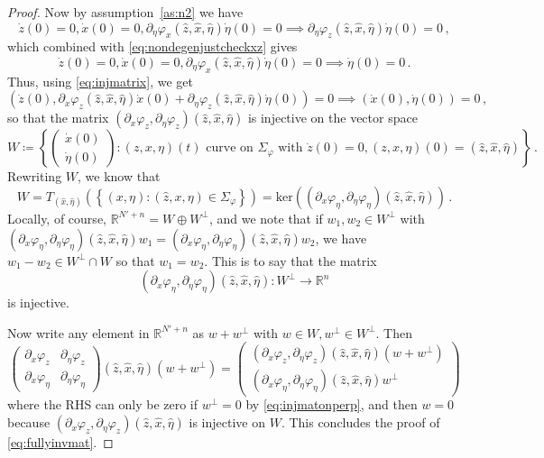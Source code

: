 \documentclass[10pt,a4paper]{amsart}
\newcommand{\RR}{\mathbb{R}}
\newcommand{\del}{\partial}
\begin{document}
\begin{proof}
	Now by assumption~\ref{as:n2} we have
	\[
		\dot z(0)=0, \dot x(0)=0,\del_\eta \varphi_x(\hat z, \hat x, \hat \eta) \dot \eta(0) =0 \implies \del_\eta\varphi_z(\hat z,\hat x,\hat \eta)\dot \eta(0) = 0\,,%
	\]
	which combined with \cref{eq:nondegenjustcheckxz} gives
	\[
		\dot z(0)=0, \dot x(0)=0,\del_\eta \varphi_x(\hat z, \hat x, \hat \eta) \dot \eta(0) =0 \implies \dot\eta(0)=0\,.
	\]
	Thus, using \cref{eq:injmatrix}, we get
	\[
		(\dot z(0), %
		\del_x\varphi_{z}(\hat z, \hat x, \hat \eta)\dot x(0) +  \del_\eta\varphi_{z}(\hat z, \hat x, \hat \eta)\dot\eta(0)) = 0 \implies (\dot x(0), \dot\eta(0)) =0\,,
	\]
	so that the matrix $(\del_x\varphi_z, \del_\eta\varphi_z)(\hat z, \hat x, \hat \eta)$ is injective on the vector space
	\[
		W\coloneqq \left\{\begin{pmatrix}\dot x(0)\\ \dot\eta(0)\end{pmatrix} \colon (z,x,\eta)(t) \text{ curve on } \Sigma_\varphi\text{ with } \dot z(0)=0, (z,x,\eta)(0)=(\hat z,\hat x,\hat \eta)\right\}\,.
	\]
	Rewriting $W$, %
	we know that
	\[
		W = T_{(\hat x,\hat \eta)}\left(\left\{(x,\eta)\colon (\hat z, x,\eta) \in \Sigma_\varphi\right\}\right) = \mathrm{ker}((\del_x\varphi_\eta,\del_\eta\varphi_\eta)(\hat z,\hat x,\hat\eta))\,. 
	\]
	Locally, of course, $\RR^{N'+n} = W \oplus W^\perp$, and we note that if $w_1,w_2\in W^\perp$ with $(\del_x\varphi_\eta,\del_\eta\varphi_\eta)(\hat z, \hat x,\hat \eta) w_1 = (\del_x\varphi_\eta,\del_\eta\varphi_\eta)(\hat z, \hat x,\hat \eta) w_2$, we have $w_1-w_2 \in W^\perp \cap W$ so that $w_1=w_2$. This is to say that the matrix
	\begin{equation}\label{eq:injmatonperp}
		(\del_x\varphi_\eta,\del_\eta\varphi_\eta)(\hat z, \hat x,\hat \eta)\colon W^\perp \to \RR^n
	\end{equation}
	is injective. 

	Now write any element in $\RR^{N'+n}$ as $w+ w^\perp$ with $w\in W,w^\perp\in W^\perp$. Then
	\[
		\begin{pmatrix}
			\del_x\varphi_z & \del_\eta\varphi_z \\ 
			\del_x\varphi_\eta & \del_\eta\varphi_\eta
			\end{pmatrix}(\hat z,\hat x,\hat\eta) (w+w^\perp) = \begin{pmatrix}(\del_x\varphi_z,\del_\eta\varphi_z)(\hat z,\hat x,\hat\eta)(w+w^\perp)\\ (\del_x\varphi_\eta,\del_\eta\varphi_\eta)(\hat z,\hat x,\hat\eta)w^\perp\end{pmatrix}
	\]
	where the RHS can only be zero if $w^\perp = 0$ by \cref{eq:injmatonperp}, and then $w=0$ because $(\del_x\varphi_z, \del_\eta\varphi_z)(\hat z, \hat x, \hat \eta)$ is injective on $W$. This concludes the proof of \cref{eq:fullyinvmat}.
\end{proof}
\end{document}
